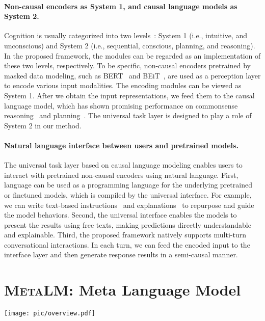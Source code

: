 \documentclass{article}
\theoremstyle{plain}
\theoremstyle{definition}
\theoremstyle{remark}
\newcommand\ours{\textsc{MetaLM}}
\begin{document}
\paragraph{Non-causal encoders as System 1, and causal language models as System 2.}
Cognition is usually categorized into two levels~\citep{think:fast:slow,system12bengio}: System 1 (i.e., intuitive, and unconscious) and System 2 (i.e., sequential, conscious, planning, and reasoning).
In the proposed framework, the modules can be regarded as an implementation of these two levels, respectively.
To be specific, non-causal encoders pretrained by masked data modeling, such as BERT~\citep{bert} and BEiT~\citep{beit}, are used as a perception layer to encode various input modalities.
The encoding modules can be viewed as System 1.
After we obtain the input representations, we feed them to the causal language model, which has shown promising performance on commonsense reasoning~\citep{palm} and planning~\citep{gpt:planner}.
The universal task layer is designed to play a role of System 2 in our method.


\paragraph{Natural language interface between users and pretrained models.}
The universal task layer based on causal language modeling enables users to interact with pretrained non-causal encoders using natural language.
First, language can be used as a programming language for the underlying pretrained or finetuned models, which is compiled by the universal interface.
For example, we can write text-based instructions~\citep{instructgpt} and explanations~\citep{chain:of:thought} to repurpose and guide the model behaviors.
Second, the universal interface enables the models to present the results using free texts, making predictions directly understandable and explainable.
Third, the proposed framework natively supports multi-turn conversational interactions.
In each turn, we can feed the encoded input to the interface layer and then generate response results in a semi-causal manner.


\section{\ours{}: Meta Language Model}
\label{sec:method}


\begin{figure*}[t]
\centering
\texttt{[image: pic/overview.pdf]}
\caption{Overview of \ours{}. The semi-causal language model serves as a general-purpose interface and supports interactions with various foundation models.}
\label{fig:overview}
\end{figure*}
\end{document}
